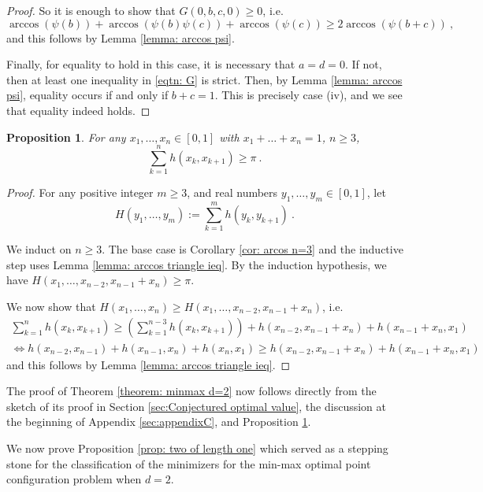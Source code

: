 \documentclass[reqno,hidelinks,11pt]{amsart}
\numberwithin{equation}{section}
\newtheorem{proposition}[theorem]{Proposition}
\begin{document}
\begin{proof}
So it is enough to show that $G(0,b,c,0)\ge0$, i.e.
\[
\arccos(\psi(b))+\arccos(\psi(b)\psi(c))+\arccos(\psi(c))\ge2\arccos(\psi(b+c))~,
\]
and this follows by Lemma \ref{lemma: arccos psi}.

Finally, for equality to hold in this case, it is necessary that $a=d=0$. If not, then at least one inequality in \eqref{eqtn: G} is strict. Then, by Lemma \ref{lemma: arccos psi}, equality occurs if and only if $b+c=1$. This is precisely case (iv), and we see that equality indeed holds. 
\end{proof}

\begin{proposition}\label{prop: spherical inequality}
    For any $x_1,\dots,x_n\in[0,1]$ with $x_1+\dots+x_n=1$, $n\ge3$,
    \[
    \sum_{k=1}^n h(x_k,x_{k+1})\ge\pi~.
    \]
\end{proposition}
\begin{proof}
    For any positive integer $m\ge3$, and real numbers $y_1,\dots,y_m\in[0,1]$, let 
    \[
    H(y_1,\dots,y_m):=\sum_{k=1}^m h(y_k,y_{k+1})~.
    \]
    
    We induct on $n\ge3$. The base case is Corollary \ref{cor: arcos n=3} and the inductive step uses Lemma \ref{lemma: arccos triangle ieq}. By the induction hypothesis, we have $H(x_1,\dots,x_{n-2},x_{n-1}+x_n)\ge\pi$.
    
    We now show that $H(x_1,\dots,x_n)\ge H(x_1,\dots,x_{n-2},x_{n-1}+x_n)$, i.e.
    \begin{align*}
        \sum_{k=1}^n h(x_k,x_{k+1})\ge \left(\sum_{k=1}^{n-3}h(x_k,x_{k+1})\right)+h(x_{n-2},x_{n-1}+x_n)+h(x_{n-1}+x_n,x_1)\\
        \Leftrightarrow h(x_{n-2},x_{n-1})+h(x_{n-1},x_n)+h(x_n,x_1)\ge h(x_{n-2},x_{n-1}+x_n)+h(x_{n-1}+x_n,x_1)
    \end{align*}
    and this follows by Lemma \ref{lemma: arccos triangle ieq}.
\end{proof}

The proof of Theorem \ref{theorem: minmax d=2} now follows directly from the sketch of its proof in Section \ref{sec:Conjectured optimal value}, the discussion at the beginning of Appendix \ref{sec:appendixC}, and Proposition \ref{prop: spherical inequality}.

We now prove Proposition \ref{prop: two of length one} which served as a stepping stone for the classification of the minimizers for the min-max optimal point configuration problem when $d=2$. 
\end{document}
